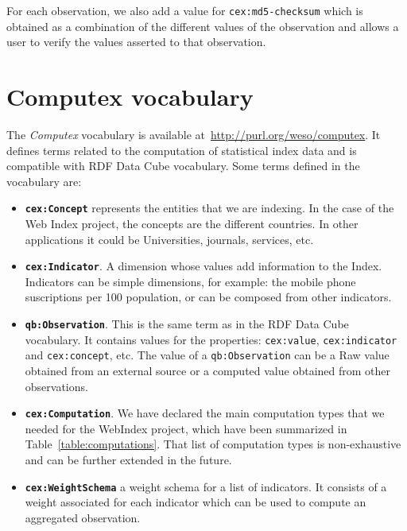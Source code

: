 \documentclass{acm_proc_article-sp}
\begin{document}
For each observation, we also add a value for 
\lstinline|cex:md5-checksum| which is obtained as a combination of the 
different values of the observation and allows a user to verify the
values asserted to that observation.


\section{Computex vocabulary}

The \emph{Computex} vocabulary is available
at~\url{http://purl.org/weso/computex}. It defines terms related to the
computation of statistical index data and is compatible with RDF Data Cube
vocabulary. Some terms defined in the vocabulary are:

\begin{itemize}
\item\textbf{\lstinline|cex:Concept|} represents the entities that we are
indexing.
In the case of the Web Index project, the concepts are the different countries.
In other applications it could be Universities, journals, services, etc.

\item\textbf{\lstinline|cex:Indicator|}. A dimension whose values add
information to the Index.
Indicators can be simple dimensions, for example: the mobile phone
suscriptions per 100 population, or can be composed from other
indicators. 

\item\textbf{\lstinline|qb:Observation|}. This is the same term as in the 
RDF Data Cube vocabulary. It contains values for the
properties: \lstinline|cex:value|, \lstinline|cex:indicator| 
and \lstinline|cex:concept|, etc. 
The value of a \lstinline|qb:Observation| can be a Raw value
   obtained from an external source or a computed value obtained from other
   observations.

\item\textbf{\lstinline|cex:Computation|}. We have declared the main computation
types that we needed for the WebIndex project, which have been summarized in
Table~\ref{table:computations}. That list of computation types is non-exhaustive
and can be further extended in the future. 

\item\textbf{\lstinline|cex:WeightSchema|} a weight schema for a list of
indicators. It consists of a weight associated for each indicator which can be
used to compute an aggregated observation.

\end{itemize}
\end{document}
